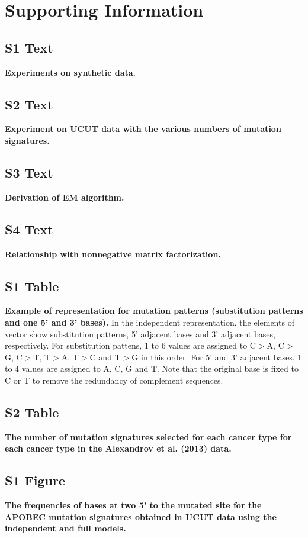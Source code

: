 \documentclass[10pt,letterpaper]{article}
\begin{document}
\section*{Supporting Information}
\subsection*{S1 Text}
\label{simulation}
{\bf Experiments on synthetic data.}

\subsection*{S2 Text}
\label{UCUT_supp}
{\bf Experiment on UCUT data with the various numbers of mutation signatures.}

\subsection*{S3 Text}
\label{EM_math}
{\bf Derivation of EM algorithm.}

\subsection*{S4 Text}
\label{NMF_math}
{\bf Relationship with nonnegative matrix factorization.}

\subsection*{S1 Table}
\label{mfexample}
{\bf Example of representation for mutation patterns (substitution patterns and one 5' and 3' bases).}
In the independent representation, the elements of vector show substitution patterns, 5' adjacent bases and 3' adjacent bases, respectively.
For substitution pattens, 1 to 6 values are assigned to C$>$A, C$>$G, C$>$T, T$>$A, T$>$C and T$>$G in this order.
For 5' and 3' adjacent bases, 1 to 4 values are assigned to A, C, G and T.
Note that the original base is fixed to C or T to remove the redundancy of complement sequences.

\subsection*{S2 Table}
\label{nature2013_sigNum}
{\bf The number of mutation signatures selected for each cancer type for each cancer type in the Alexandrov et al. (2013) data.}

\subsection*{S1 Figure}
\label{UCUT_APOBEC_twoFivePrime}
{\bf The frequencies of bases at two 5' to the mutated site for the APOBEC mutation signatures obtained in UCUT data using the independent and full models.}
\end{document}
